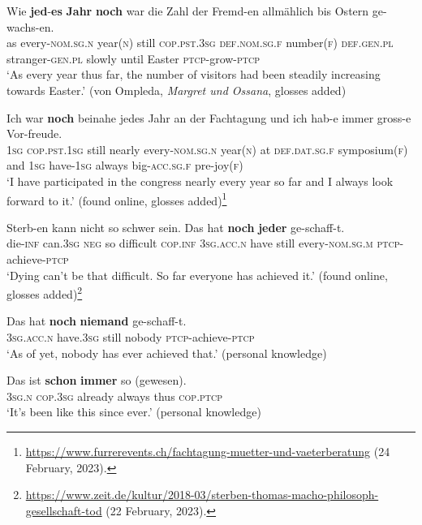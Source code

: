 \begin{exe}
	\ex 
	\gll Wie \textbf{jed}-\textbf{es} \textbf{Jahr} \textbf{noch} war die Zahl der Fremd-en allmählich bis Ostern ge-wachs-en.\\
	as every-\textsc{nom}.\textsc{sg}.\textsc{n} year(\textsc{n}) still \textsc{cop}.\textsc{pst}.3\textsc{sg} \textsc{def}.\textsc{nom}.\textsc{sg}.\textsc{f} number(\textsc{f}) \textsc{def}.\textsc{gen}.\textsc{pl} stranger-\textsc{gen}.\textsc{pl} slowly until Easter \textsc{ptcp}-grow-\textsc{ptcp}\\
	\glt \lq As every year thus far, the number of visitors had been steadily increasing towards Easter.\rq{ }(von Ompleda, \textit{Margret und Ossana}, glosses added)

	\ex 
	\gll Ich war \textbf{noch} beinahe jedes Jahr an der Fachtagung und ich hab-e immer gross-e Vor-freude.\\
	1\textsc{sg} \textsc{cop}.\textsc{pst}.1\textsc{sg} still nearly every-\textsc{nom}.\textsc{sg}.\textsc{n} year(\textsc{n}) at \textsc{def}.\textsc{dat}.\textsc{sg}.\textsc{f} symposium(\textsc{f}) and 1\textsc{sg} have-1\textsc{sg} always big-\textsc{acc}.\textsc{sg}.\textsc{f} pre-joy(\textsc{f})\\
	\glt \lq I have participated in the congress nearly every year so far and I always look forward to it.\rq{ }(found online, glosses added)\footnote{\url{https://www.furrerevents.ch/fachtagung-muetter-und-vaeterberatung} (24 February, 2023).}
	
	\ex
	\gll Sterb-en kann nicht so schwer sein. Das hat \textbf{noch} \textbf{jeder} ge-schaff-t.\\
	die-\textsc{inf} can.3\textsc{sg} \textsc{neg} so difficult \textsc{cop}.\textsc{inf} 3\textsc{sg}.\textsc{acc}.\textsc{n} have still every-\textsc{nom}.\textsc{sg}.\textsc{m} \textsc{ptcp}-achieve-\textsc{ptcp}\\
	\glt \lq Dying can’t be that difficult. So far everyone has achieved it.\rq{ }(found online, glosses added)\footnote{\url{https://www.zeit.de/kultur/2018-03/sterben-thomas-macho-philosoph-gesellschaft-tod} (22 February, 2023).}
	
	\ex\label{exAppendixGermanNochJeder4}
	\gll Das hat \textbf{noch} \textbf{niemand} ge-schaff-t.\\
	3\textsc{sg}.\textsc{acc}.\textsc{n} have.3\textsc{sg} still nobody \textsc{ptcp}-achieve-\textsc{ptcp}\\
	\glt \lq As of yet, nobody has ever achieved that.\rq{ }(personal knowledge)
	
	\ex\label{exAppendixGermanNochJeder5}
	\gll Das ist \textbf{schon} \textbf{immer} so \textup{(}gewesen\textup{)}.\\
		3\textsc{sg}.\textsc{n} \textsc{cop}.3\textsc{sg} already always thus \phantom{(}\textsc{cop}.\textsc{ptcp}\\
	\glt \lq It's been like this since ever.\rq{ }(personal knowledge)
	\end{exe}

